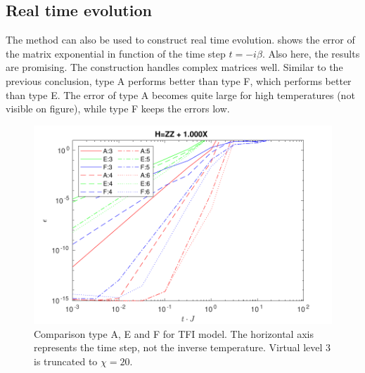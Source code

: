 




\subsection{Real time evolution} \label{subsec_rt_evo}

The method can also be used to construct real time evolution.  shows the error of the matrix exponential in function of the time step $t = -i \beta $. Also here, the results are promising. The construction handles complex matrices well. Similar to the previous conclusion, type A performs better than type F, which performs better than type E. The error of type A becomes quite large for high temperatures (not visible on figure), while type F keeps the errors low.

\begin{figure}[!htbp]
    \center
    \includegraphics[width=\textwidth]{Figuren/benchmarking/1D_t_ising_time.pdf}
    \caption{Comparison type A, E and F for \Gls{TFI} model. The horizontal axis represents the time step, not the inverse temperature. Virtual level 3 is truncated to $\chi=20$.  }
    \label{fig:benchmark:tising_time}
\end{figure}

